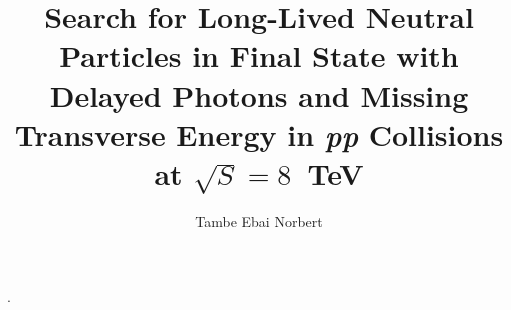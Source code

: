 \phd. %
\title{\bf Search for Long-Lived Neutral Particles in Final State with Delayed Photons and Missing Transverse Energy in \textit{pp} Collisions at $\sqrt{S} = 8$~TeV
    }
\author{Tambe Ebai Norbert}


\copyrightpage %

\abstract{}

\acknowledgements{}
\dedication{}


\beforepreface 

\figurespage
\tablespage

\afterpreface            
